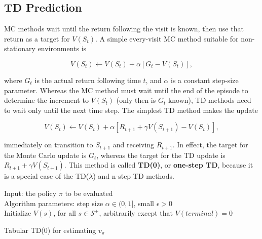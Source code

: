 \documentclass[11pt]{article}
\begin{document}
\subsection{TD Prediction}
\label{sec:org14475bd}

MC methods wait until the return following the visit is known, then use that
return as a target for \(V(S_t)\). A simple every-visit MC method suitable for
non-stationary environments is

\begin{equation}
V(S_t) \leftarrow V(S_t) + \alpha [ G_t - V(S_t)],
\end{equation}

where \(G_t\) is the actual return following time \(t\), and \(\alpha\) is a constant
step-size parameter. Whereas the MC method must wait until the end of the
episode to determine the increment to \(V(S_t)\) (only then is \(G_t\) known), TD
methods need to wait only until the next time step. The simplest TD method makes
the update

\begin{equation}
V(S_t) \leftarrow V(S_t) + \alpha [ R_{t+1} + \gamma V(S_{t+1})- V(S_t)],
\end{equation}

immediately on transition to \(S_{t+1}\) and receiving \(R_{t+1}\). In effect, the
target for the Monte Carlo update is \(G_t\), whereas the target for the TD update
is \(R_{t+1} + \gamma V(S_{t+1})\). This method is called \textbf{TD(0)}, or \textbf{one-step
TD}, because it is a special case of the TD(\(\lambda\)) and n-step TD methods.
\newline
\newline
\begin{algorithm}[H]
Input: the policy $\pi$ to be evaluated \\
Algorithm parameters: step size $\alpha \in (0,1]$, small $\epsilon > 0$ \\
Initialize $V(s)$, for all $s \in \mathcal{S}^+$, arbitrarily except that $V(terminal) = 0$ \\

\;
\;
\caption{Tabular TD(0) for estimating $v_\pi$}
\end{algorithm}
\end{document}
